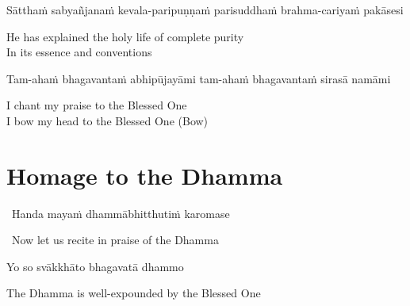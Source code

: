 \begin{pali-hang}
  Sātthaṁ sabyañjanaṁ kevala-paripuṇṇaṁ parisuddhaṁ brahma-cariyaṁ pakāsesi
\end{pali-hang}

\begin{english}
  He has explained the holy life of complete purity\makeatletter\hyperlink{endnote4-appendix}\makeatother\\
  In its essence and conventions
\end{english}

\begin{pali-hang}
  Tam-ahaṁ bhagavantaṁ abhipūjayāmi tam-ahaṁ bhagavantaṁ sirasā namāmi
\end{pali-hang}

\begin{english}
  I chant my praise to the Blessed One\\
  I bow my head to the Blessed One \hfill{(Bow)}
\end{english}

\section{Homage to the Dhamma}
\label{homage-dhamma}

\begin{leader}
  \anglebracketleft\ \hspace{-0.5mm}Handa mayaṁ dhammābhitthutiṁ karomase \hspace{-0.5mm}\anglebracketright\
\end{leader}
\begin{leader-english-belowpali}
  \anglebracketleft\ \hspace{-0.5mm}Now let us recite in praise of the Dhamma \hspace{-0.5mm}\anglebracketright\
\end{leader-english-belowpali}

Yo so svākkhāto bhagavatā dhammo

\begin{english}
  The Dhamma is well-expounded by the Blessed One
\end{english}

